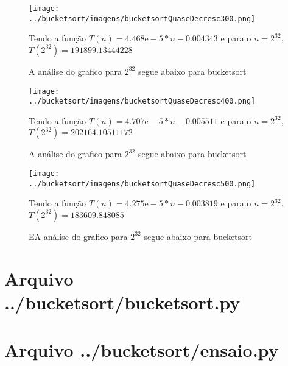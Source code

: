 \documentclass[12pt,a4paper,twoside]{report}
\begin{document}
\clearpage


\begin{figure}[ht]
\centering \texttt{[image: ../bucketsort/imagens/bucketsortQuaseDecresc300.png]}
\caption{A análise do grafico para $2^{32}$ segue abaixo para bucketsort}

Tendo a função $T(n) = 4.468\mathrm{e}-5*n-0.004343$ e para o $n =2^{32}$, $T(2^{32}) = 191899.13444228$ 
\label{fig:bucketsortQuaseDecresc300}
\end{figure}



\begin{figure}[ht]
\centering \texttt{[image: ../bucketsort/imagens/bucketsortQuaseDecresc400.png]}
\caption{A análise do grafico para $2^{32}$ segue abaixo para bucketsort}

Tendo a função $T(n) = 4.707\mathrm{e}-5*n-0.005511$ e para o $n =2^{32}$, $T(2^{32}) = 202164.10511172$ 
\label{fig:bucketsortQuaseDecresc400}
\end{figure}




\begin{figure}[ht]
\centering \texttt{[image: ../bucketsort/imagens/bucketsortQuaseDecresc500.png]}
\caption{EA análise do grafico para $2^{32}$ segue abaixo para bucketsort}

Tendo a função $T(n) = 4.275\mathrm{e}-5*n-0.003819$ e para o $n =2^{32}$, $T(2^{32}) = 183609.848085$ 
\end{figure}


\clearpage
\clearpage
{}
\appendix

\chapter{Arquivo ../bucketsort/bucketsort.py \label{ap:bucketsort}}


\chapter{Arquivo ../bucketsort/ensaio.py \label{ap:bucketsortensaio}}

\end{document}
